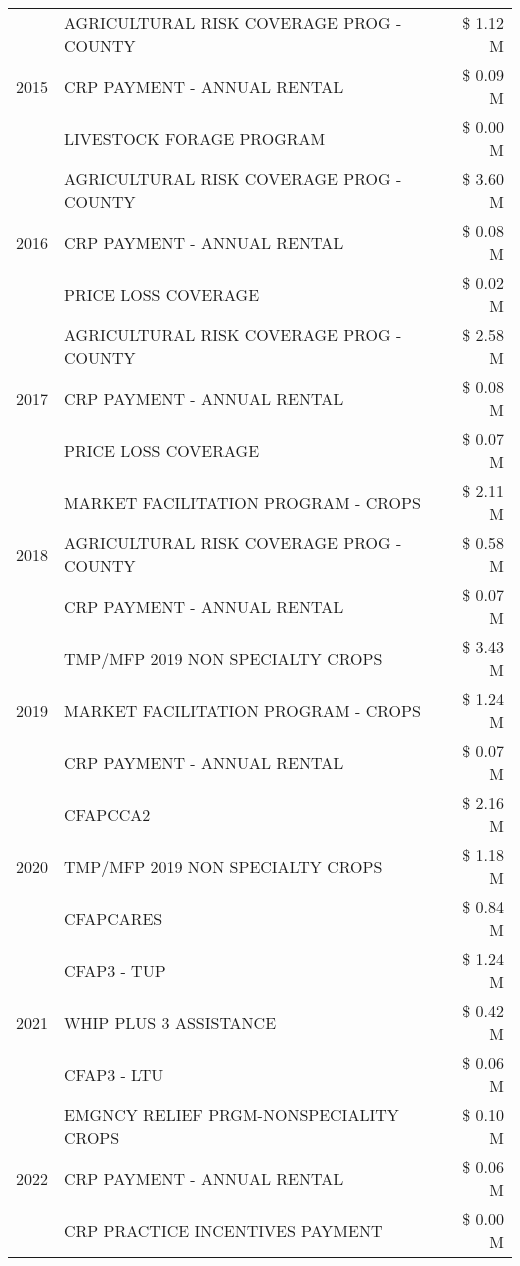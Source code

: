 \begin{tabular}{llr}
\cline{1-3}
\multirow[t]{3}{*}{2015} & AGRICULTURAL RISK COVERAGE PROG - COUNTY & \$ 1.12 M \\
 & CRP PAYMENT - ANNUAL RENTAL & \$ 0.09 M \\
 & LIVESTOCK FORAGE PROGRAM & \$ 0.00 M \\
\cline{1-3}
\multirow[t]{3}{*}{2016} & AGRICULTURAL RISK COVERAGE PROG - COUNTY & \$ 3.60 M \\
 & CRP PAYMENT - ANNUAL RENTAL & \$ 0.08 M \\
 & PRICE LOSS COVERAGE & \$ 0.02 M \\
\cline{1-3}
\multirow[t]{3}{*}{2017} & AGRICULTURAL RISK COVERAGE PROG - COUNTY & \$ 2.58 M \\
 & CRP PAYMENT - ANNUAL RENTAL & \$ 0.08 M \\
 & PRICE LOSS COVERAGE & \$ 0.07 M \\
\cline{1-3}
\multirow[t]{3}{*}{2018} & MARKET FACILITATION PROGRAM - CROPS & \$ 2.11 M \\
 & AGRICULTURAL RISK COVERAGE PROG - COUNTY & \$ 0.58 M \\
 & CRP PAYMENT - ANNUAL RENTAL & \$ 0.07 M \\
\cline{1-3}
\multirow[t]{3}{*}{2019} & TMP/MFP 2019 NON SPECIALTY CROPS & \$ 3.43 M \\
 & MARKET FACILITATION PROGRAM - CROPS & \$ 1.24 M \\
 & CRP PAYMENT - ANNUAL RENTAL & \$ 0.07 M \\
\cline{1-3}
\multirow[t]{3}{*}{2020} & CFAPCCA2 & \$ 2.16 M \\
 & TMP/MFP 2019 NON SPECIALTY CROPS & \$ 1.18 M \\
 & CFAPCARES & \$ 0.84 M \\
\cline{1-3}
\multirow[t]{3}{*}{2021} & CFAP3 - TUP & \$ 1.24 M \\
 & WHIP PLUS 3 ASSISTANCE & \$ 0.42 M \\
 & CFAP3 - LTU & \$ 0.06 M \\
\cline{1-3}
\multirow[t]{3}{*}{2022} & EMGNCY RELIEF PRGM-NONSPECIALITY CROPS & \$ 0.10 M \\
 & CRP PAYMENT - ANNUAL RENTAL & \$ 0.06 M \\
 & CRP PRACTICE INCENTIVES PAYMENT & \$ 0.00 M \\
\cline{1-3}
\bottomrule
\end{tabular}
